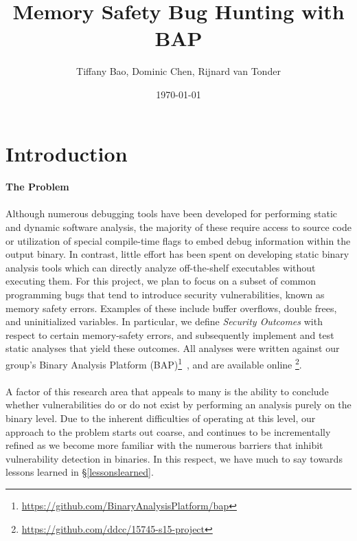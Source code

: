 \documentclass[letterpaper,11pt]{article}
\begin{document}
\date{\today}

\title{\Large \bf Memory Safety Bug Hunting with BAP}

\author{Tiffany Bao, Dominic Chen, Rijnard van Tonder}

\maketitle

\section{Introduction}
\label{intro}

\paragraph{The Problem}

\paragraph{}
Although numerous debugging tools have been developed for performing static and
dynamic software analysis, the majority of these require access to source
code or utilization of special compile-time flags to embed debug information
within the output binary. In contrast, little effort has been spent on
developing static binary analysis tools which can directly analyze
off-the-­shelf executables without executing them. For this project, we plan to
focus on a subset of common programming bugs that tend to introduce security
vulnerabilities, known as memory safety errors. Examples of these include
buffer overflows, double frees, and uninitialized variables. In particular, we
define \emph{Security Outcomes} with respect to certain memory-safety errors,
and subsequently implement and test static analyses that yield these outcomes.
All analyses were written against our group's Binary Analysis Platform
(BAP)\footnote{\url{https://github.com/BinaryAnalysisPlatform/bap}}~\cite{bap, brumley2011bap},
and are available online \footnote{\url{https://github.com/ddcc/15745-s15-project}}.

\paragraph{}
A factor of this research area that appeals to many is the ability to
conclude whether vulnerabilities do or do not exist by performing
an analysis purely on the binary level. Due to the inherent difficulties
of operating at this level, %
our approach to the problem starts out coarse, and continues to be
incrementally refined as we become more familiar with the numerous
barriers that inhibit vulnerability detection in binaries. In this respect,
we have much to say towards lessons learned in \S\ref{lessonslearned}.
\end{document}
